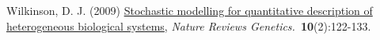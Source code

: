 \documentclass[mathserif,handout]{beamer}
\begin{document}
{\begin{thebibliography}{}






Wilkinson,
D. J. (2009) \alert{\href{http://dx.doi.org/10.1038/nrg2509}{Stochastic modelling for quantitative description of
heterogeneous biological systems}}, {\em Nature Reviews Genetics.\/}~\textbf{10}(2):122-133.


\beamertemplatebookbibitems



\end{thebibliography}}
\end{document}

